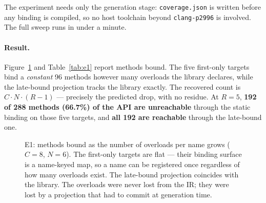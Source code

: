 \documentclass[11pt,a4paper]{article}
\newcommand{\code}[1]{\texttt{\small #1}}
\begin{document}
The experiment needs only the generation stage: \code{coverage.json} is written
before any binding is compiled, so no host toolchain beyond \code{clang-p2996}
is involved. The full sweep runs in under a minute.

\paragraph{Result.} Figure~\ref{fig:e1} and Table~\ref{tab:e1} report methods bound.
The five first-only targets bind a \emph{constant} 96 methods however many
overloads the library declares, while the late-bound projection tracks the
library exactly. The recovered count is $C\cdot N\cdot(R-1)$ --- precisely the
predicted drop, with no residue. At $R=5$, \textbf{192 of 288 methods (66.7\%)
of the API are unreachable} through the static binding on those five targets,
and \textbf{all 192 are reachable} through the late-bound one.

\begin{figure}[h]
\centering
{}
\caption{E1: methods bound as the number of overloads per name grows
($C=8$, $N=6$). The first-only targets are flat --- their binding surface is a
name-keyed map, so a name can be registered once regardless of how many
overloads exist. The late-bound projection coincides with the library. The
overloads were never lost from the IR; they were lost by a projection that had
to commit at generation time.}
\label{fig:e1}
\end{figure}
\end{document}

